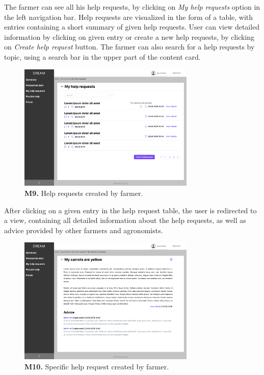     The farmer can see all his help requests, by clicking on \textit{My help requests} option in the left navigation bar. Help requests are visualized in the form of a table, with entries containing a short summary of given help requests. User can view detailed information by clicking on given entry or create a new help requests, by clicking on \textit{Create help request} button. The farmer can also search for a help requests by topic, using a search bar in the upper part of the content card.
    \begin{figure}[H]
        \centering
        \includegraphics[width=0.75\textwidth]{mockups/Farmer_Dashboard_My help requests.png}
        \caption{\textbf{M9.} Help requests created by farmer.}
    \end{figure}
    
    After clicking on a given entry in the help request table, the user is redirected to a view, containing all detailed information about the help requests, as well as advice provided by other farmers and agronomists.
    \begin{figure}[H]
        \centering
        \includegraphics[width=0.75\textwidth]{mockups/Farmer_Dashboard_My help requests_VIew request.png}
        \caption{\textbf{M10.} Specific help request created by farmer.}
    \end{figure}
    
